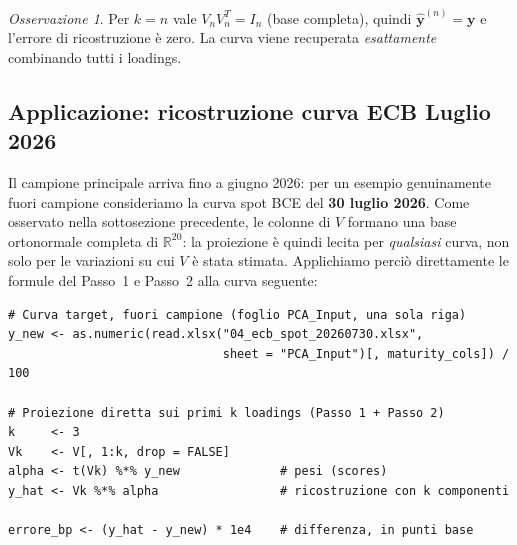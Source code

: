\documentclass[11pt,a4paper]{article}
\theoremstyle{plain}
\theoremstyle{definition}
\theoremstyle{remark}
\newtheorem*{osservazione}{Osservazione}
\begin{document}
\begin{osservazione}
Per $k = n$ vale $V_n V_n^T = I_n$ (base completa), quindi
$\hat{\mathbf{y}}^{(n)} = \mathbf{y}$ e l'errore di ricostruzione è zero.
La curva viene recuperata \emph{esattamente} combinando tutti i loadings.
\end{osservazione}

\subsection{Applicazione: ricostruzione curva ECB Luglio 2026}

Il campione principale arriva fino a giugno 2026: per un esempio genuinamente
fuori campione consideriamo la curva spot BCE del \textbf{30 luglio 2026}.
Come osservato nella sottosezione precedente, le colonne di $V$ formano una
base ortonormale completa di $\mathbb{R}^{20}$: la proiezione è quindi
lecita per \emph{qualsiasi} curva, non solo per le variazioni su cui $V$ è
stata stimata. Applichiamo perciò direttamente le formule del Passo~1 e
Passo~2 alla curva seguente:

\begin{center}
\renewcommand{\arraystretch}{1.25}
\end{center}

\begin{codebox}
\begin{Verbatim}[fontsize=\small]
# Curva target, fuori campione (foglio PCA_Input, una sola riga)
y_new <- as.numeric(read.xlsx("04_ecb_spot_20260730.xlsx",
                              sheet = "PCA_Input")[, maturity_cols]) / 100

# Proiezione diretta sui primi k loadings (Passo 1 + Passo 2)
k     <- 3
Vk    <- V[, 1:k, drop = FALSE]
alpha <- t(Vk) %*% y_new              # pesi (scores)
y_hat <- Vk %*% alpha                 # ricostruzione con k componenti

errore_bp <- (y_hat - y_new) * 1e4    # differenza, in punti base
\end{Verbatim}
\end{codebox}
\end{document}
